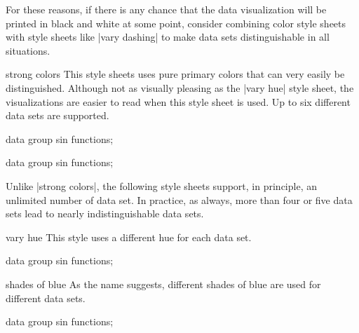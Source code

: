 For these reasons, if there is any chance that the data visualization
will be printed in black and white at some point, consider combining
color style sheets with style sheets like |vary dashing| to make data
sets distinguishable in all situations.


\begin{stylesheet}{strong colors}
  This style sheets uses pure primary colors that can very easily be
  distinguished. Although not as visually pleasing as the |vary hue|
  style sheet, the visualizations are easier to read when this style
  sheet is used. Up to six different data sets are supported.
\begin{codeexample}[width=10cm]
\tikz \datavisualization [
  visualize as smooth line/.list=
    {1,2,3,4,5,6,7,8},
  example visualization,
  style sheet=strong colors]
data group {sin functions};
\end{codeexample}
\begin{codeexample}[width=10cm]
\tikz \datavisualization [
  visualize as smooth line/.list=
    {1,2,3,4,5,6,7,8},
  example visualization,
  style sheet=strong colors,
  style sheet=vary dashing]
data group {sin functions};
\end{codeexample}
\end{stylesheet}


Unlike |strong colors|, the following style sheets support, in
principle, an unlimited number of data set. In practice, as always,
more than four or five data sets lead to nearly indistinguishable data
sets.

\begin{stylesheet}{vary hue}
  This style uses a different hue for each data set. 
\begin{codeexample}[width=10cm]
\tikz \datavisualization [
  visualize as smooth line/.list=
    {1,2,3,4,5,6,7,8},
  example visualization,
  style sheet=vary hue]
data group {sin functions};
\end{codeexample}
\end{stylesheet}

\begin{stylesheet}{shades of blue}
  As the name suggests, different shades of blue are used for different
  data sets.
\begin{codeexample}[width=10cm]
\tikz \datavisualization [
  visualize as smooth line/.list=
    {1,2,3,4,5,6,7,8},
  example visualization,
  style sheet=shades of blue]
data group {sin functions};
\end{codeexample}
\end{stylesheet}


